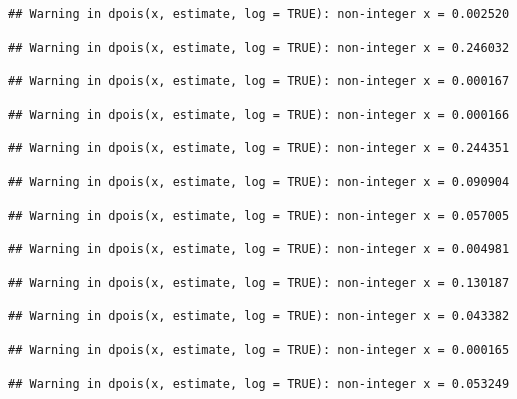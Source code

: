 \documentclass[]{article}
\begin{document}
\begin{verbatim}
## Warning in dpois(x, estimate, log = TRUE): non-integer x = 0.002520
\end{verbatim}

\begin{verbatim}
## Warning in dpois(x, estimate, log = TRUE): non-integer x = 0.246032
\end{verbatim}

\begin{verbatim}
## Warning in dpois(x, estimate, log = TRUE): non-integer x = 0.000167
\end{verbatim}

\begin{verbatim}
## Warning in dpois(x, estimate, log = TRUE): non-integer x = 0.000166
\end{verbatim}

\begin{verbatim}
## Warning in dpois(x, estimate, log = TRUE): non-integer x = 0.244351
\end{verbatim}

\begin{verbatim}
## Warning in dpois(x, estimate, log = TRUE): non-integer x = 0.090904
\end{verbatim}

\begin{verbatim}
## Warning in dpois(x, estimate, log = TRUE): non-integer x = 0.057005
\end{verbatim}

\begin{verbatim}
## Warning in dpois(x, estimate, log = TRUE): non-integer x = 0.004981
\end{verbatim}

\begin{verbatim}
## Warning in dpois(x, estimate, log = TRUE): non-integer x = 0.130187
\end{verbatim}

\begin{verbatim}
## Warning in dpois(x, estimate, log = TRUE): non-integer x = 0.043382
\end{verbatim}

\begin{verbatim}
## Warning in dpois(x, estimate, log = TRUE): non-integer x = 0.000165
\end{verbatim}

\begin{verbatim}
## Warning in dpois(x, estimate, log = TRUE): non-integer x = 0.053249
\end{verbatim}
\end{document}
